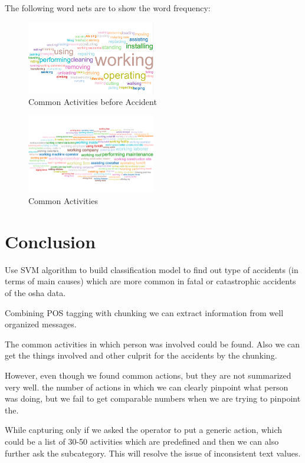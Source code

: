 \documentclass[DIV=calc, paper=a4, fontsize=11pt, twocolumn]{scrartcl}	 %
\begin{document}
The following word nets are to show the word frequency:

\begin{figure}[h!]
  \centering
      \includegraphics[width=0.5\textwidth]{bef_acc.png}
   \caption{Common Activities before Accident}
\end{figure}


\begin{figure}[h!]
  \centering
      \includegraphics[width=0.5\textwidth]{act.png}
   \caption{Common Activities}
\end{figure}


\section{Conclusion}

Use SVM algorithm to build classification model to find out type of
accidents (in terms of main causes) which are more common in fatal or
catastrophic accidents of the osha data.

Combining POS tagging with chunking we can extract information from
well organized messages.

The common activities in which person was involved could be found.
Also we can get the things involved and other culprit for the
accidents by the chunking.

However, even though we found common actions, but they are not summarized very well.
the number of actions in which we can clearly pinpoint what person was
doing, but we fail to get comparable numbers when we are trying to
pinpoint the.

While capturing only if we asked the operator to put a generic action,
which could be a list of 30-50 activities which are predefined and
then we can also further ask the subcategory. This will resolve the
issue of inconsistent text values.
\end{document}
